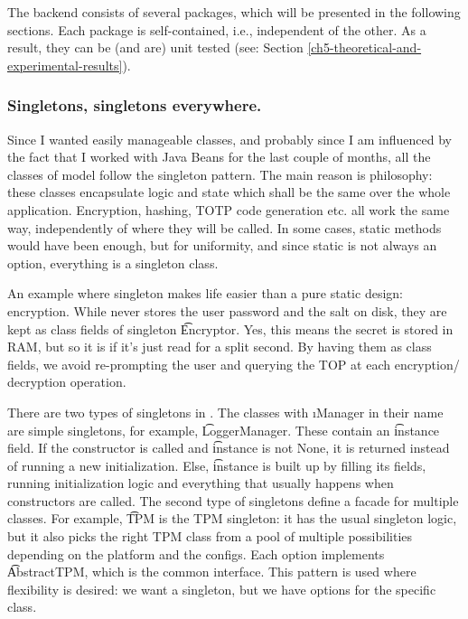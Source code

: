 The backend consists of several packages, which will be presented in the following sections.
Each package is self-contained, i.e., independent of the other.
As a result, they can be (and are) unit tested (see: Section \ref{ch5-theoretical-and-experimental-results}).



\subsubsection{Singletons, singletons everywhere.} \label{lab:ch4-singleton}

Since I wanted easily manageable classes, and probably since I am influenced by the fact that I worked with Java Beans for the last couple of months, all the classes of model follow the singleton pattern.
The main reason is philosophy: these classes encapsulate logic and state which shall be the same over the whole application.
Encryption, hashing, TOTP code generation etc. all work the same way, independently of where they will be called.
In some cases, static methods would have been enough, but for uniformity, and since static is not always an option, everything is a singleton class.

An example where singleton makes life easier than a pure static design: encryption.
While \app{} never stores the user password and the salt on disk, they are kept as class fields of singleton \t{Encryptor}.
Yes, this means the secret is stored in RAM, but so it is if it's just read for a split second.
By having them as class fields, we avoid re-prompting the user and querying the TOP at each encryption/ decryption operation.

There are two types of singletons in \app{}.
The classes with \i{Manager} in their name are simple singletons, for example, \t{LoggerManager}.
These contain an \t{instance} field.
If the constructor is called and \t{instance} is not None, it is returned instead of running a new initialization.
Else, \t{instance} is built up by filling its fields, running initialization logic and everything that usually happens when constructors are called.
The second type of singletons define a facade for multiple classes.
For example, \t{TPM} is the TPM singleton: it has the usual singleton logic, but it also picks the right TPM class from a pool of multiple possibilities depending on the platform and the configs.
Each option implements \t{AbstractTPM}, which is the common interface.
This pattern is used where flexibility is desired: we want a singleton, but we have options for the specific class.


